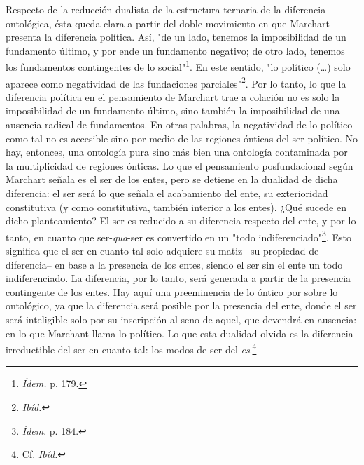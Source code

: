 Respecto de la reducción dualista de la estructura ternaria de la
diferencia ontológica, ésta queda clara a partir del doble movimiento en
que Marchart presenta la diferencia política. Así, "de un lado, tenemos
la imposibilidad de un fundamento último, y por ende un fundamento
negativo; de otro lado, tenemos los fundamentos contingentes de lo
social"\footnote{\emph{Ídem.} p. 179.}. En este sentido, "lo político
(\dots) solo aparece como negatividad de las fundaciones
parciales"\footnote{\emph{Ibíd.}}. Por lo tanto, lo que la diferencia
política en el pensamiento de Marchart trae a colación no es solo la
imposibilidad de un fundamento último, sino también la imposibilidad de
una ausencia radical de fundamentos. En otras palabras, la negatividad
de lo político como tal no es accesible sino por medio de las regiones
ónticas del ser-político. No hay, entonces, una ontología pura sino más
bien una ontología contaminada por la multiplicidad de regiones ónticas.
Lo que el pensamiento posfundacional según Marchart señala es el ser de
los entes, pero se detiene en la dualidad de dicha diferencia: el ser
será lo que señala el acabamiento del ente, su exterioridad constitutiva
(y como constitutiva, también interior a los entes). ¿Qué sucede en
dicho planteamiento? El ser es reducido a su diferencia respecto del
ente, y por lo tanto, en cuanto que ser-\emph{qua}-ser es convertido en
un "todo indiferenciado"\footnote{\emph{Ídem}. p. 184.}. Esto significa
que el ser en cuanto tal solo adquiere su matiz --su propiedad de
diferencia-- en base a la presencia de los entes, siendo el ser sin el
ente un todo indiferenciado. La diferencia, por lo tanto, será generada
a partir de la presencia contingente de los entes. Hay aquí una
preeminencia de lo óntico por sobre lo ontológico, ya que la diferencia
será posible por la presencia del ente, donde el ser será inteligible
solo por su inscripción al seno de aquel, que devendrá en ausencia: en
lo que Marchant llama lo político. Lo que esta dualidad olvida es la
diferencia irreductible del ser en cuanto tal: los modos de ser del
\emph{es}.\footnote{Cf. \emph{Ibíd.}}

